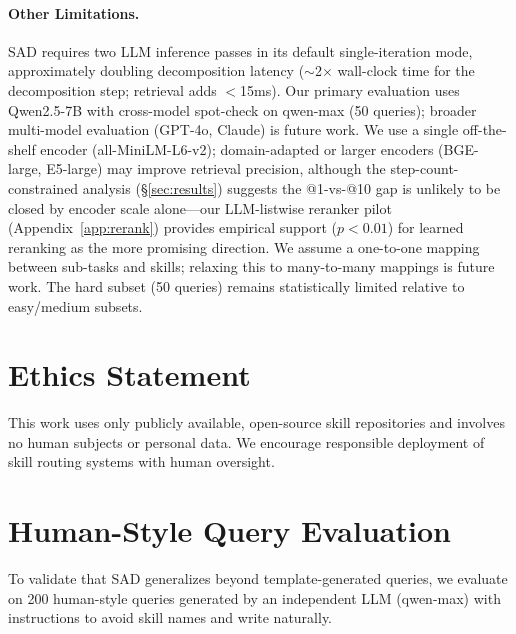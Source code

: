 \documentclass[11pt]{article}
\begin{document}
\paragraph{Other Limitations.}
SAD requires two LLM inference passes in its default single-iteration mode, approximately doubling decomposition latency ($\sim$2$\times$ wall-clock time for the decomposition step; retrieval adds $<$15ms).
Our primary evaluation uses Qwen2.5-7B with cross-model spot-check on qwen-max (50 queries); broader multi-model evaluation (GPT-4o, Claude) is future work.
We use a single off-the-shelf encoder (all-MiniLM-L6-v2); domain-adapted or larger encoders (BGE-large, E5-large) may improve retrieval precision, although the step-count-constrained analysis (\S\ref{sec:results}) suggests the @1-vs-@10 gap is unlikely to be closed by encoder scale alone---our LLM-listwise reranker pilot (Appendix~\ref{app:rerank}) provides empirical support ($p{<}0.01$) for learned reranking as the more promising direction.
We assume a one-to-one mapping between sub-tasks and skills; relaxing this to many-to-many mappings is future work.
The hard subset (50 queries) remains statistically limited relative to easy/medium subsets.

\section*{Ethics Statement}

This work uses only publicly available, open-source skill repositories and involves no human subjects or personal data.
We encourage responsible deployment of skill routing systems with human oversight.

\appendix

\section{Human-Style Query Evaluation}
\label{sec:human}

To validate that SAD generalizes beyond template-generated queries, we evaluate on 200 human-style queries generated by an independent LLM (qwen-max) with instructions to avoid skill names and write naturally.
\end{document}
